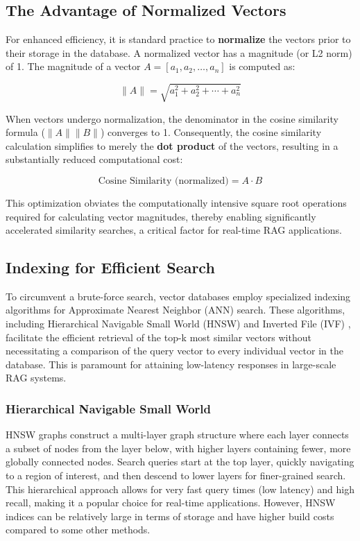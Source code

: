 \subsection{The Advantage of Normalized Vectors}
For enhanced efficiency, it is standard practice to \textbf{normalize} the vectors prior to their storage in the database. A normalized vector has a magnitude (or L2 norm) of 1. The magnitude of a vector \(A = [a_1, a_2, \ldots, a_n]\) is computed as:

\begin{equation}
\|A\| = \sqrt{a_1^2 + a_2^2 + \cdots + a_n^2}
\end{equation}

When vectors undergo normalization, the denominator in the cosine similarity formula (\(\|A\| \|B\|\)) converges to 1. Consequently, the cosine similarity calculation simplifies to merely the \textbf{dot product} of the vectors, resulting in a substantially reduced computational cost:

\begin{equation}
\text{Cosine Similarity (normalized)} = A \cdot B
\end{equation}

This optimization obviates the computationally intensive square root operations required for calculating vector magnitudes, thereby enabling significantly accelerated similarity searches, a critical factor for real-time RAG applications.


\subsection{Indexing for Efficient Search}
To circumvent a brute-force search, vector databases employ specialized indexing algorithms for Approximate Nearest Neighbor (ANN) search. These algorithms, including Hierarchical Navigable Small World (HNSW) \autocite{hnsw_malkov_2018} and Inverted File (IVF) \autocite{ivf_zobel}, facilitate the efficient retrieval of the top-k most similar vectors without necessitating a comparison of the query vector to every individual vector in the database. This is paramount for attaining low-latency responses in large-scale RAG systems.

\subsubsection{Hierarchical Navigable Small World}
HNSW graphs construct a multi-layer graph structure where each layer connects a subset of nodes from the layer below, with higher layers containing fewer, more globally connected nodes. Search queries start at the top layer, quickly navigating to a region of interest, and then descend to lower layers for finer-grained search. This hierarchical approach allows for very fast query times (low latency) and high recall, making it a popular choice for real-time applications. However, HNSW indices can be relatively large in terms of storage and have higher build costs compared to some other methods.

